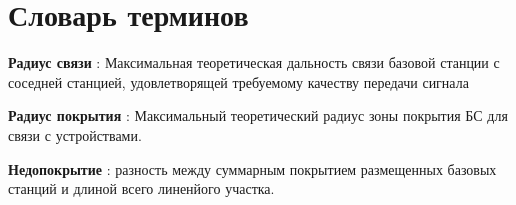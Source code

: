 \chapter*{Словарь терминов}             %


\textbf{Радиус связи} : Максимальная теоретическая дальность связи базовой станции с соседней станцией, удовлетворящей требуемому качеству передачи сигнала

\textbf{Радиус покрытия} : Максимальный теоретический радиус зоны покрытия БС для связи с устройствами.

\textbf{Недопокрытие} : разность между суммарным покрытием размещенных базовых станций и длиной всего линенйого участка.
